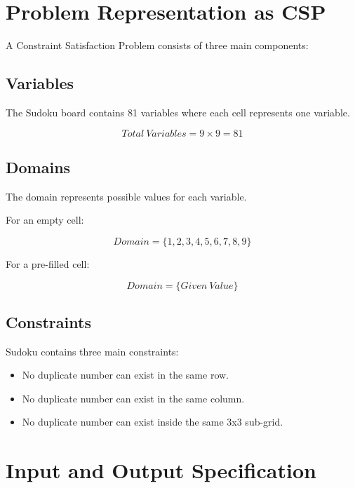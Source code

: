 \documentclass[12pt,a4paper]{article}
\begin{document}

\section{Problem Representation as CSP}


A Constraint Satisfaction Problem consists of three main components:

\subsection{Variables}


The Sudoku board contains 81 variables where each cell represents one
variable.


\[
Total\ Variables = 9 \times 9 = 81
\]


\subsection{Domains}


The domain represents possible values for each variable.

For an empty cell:

\[
Domain = \{1,2,3,4,5,6,7,8,9\}
\]


For a pre-filled cell:

\[
Domain = \{Given\ Value\}
\]



\subsection{Constraints}


Sudoku contains three main constraints:

\begin{itemize}

\item No duplicate number can exist in the same row.

\item No duplicate number can exist in the same column.

\item No duplicate number can exist inside the same 3x3 sub-grid.

\end{itemize}




\section{Input and Output Specification}
\end{document}
